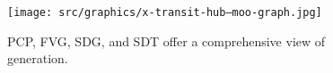 \begin{figure}[H]
	\centering
	\texttt{[image: src/graphics/x-transit-hub--moo-graph.jpg]}
	\caption*{%
		PCP, FVG, SDG, and SDT offer a comprehensive view of generation.
	}
	\vspace*{-0.5\baselineskip}%
	\label{
		fig:x-transit-hub--moo-graph
	}
\end{figure}

